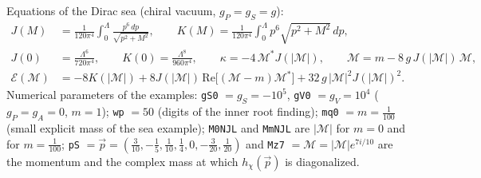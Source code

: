 \documentclass[10pt,a4paper]{article}
\begin{document}
Equations of the Dirac sea (chiral vacuum, $g_P=g_S=g$):
\begin{align*}
J(M)&=\frac{1}{120\pi^4}\int_0^\Lambda\frac{p^6\,dp}{\sqrt{p^2+M^2}},\qquad K(M)=\frac{1}{120\pi^4}\int_0^\Lambda p^6\sqrt{p^2+M^2}\,dp, \\
J(0)&=\frac{\Lambda^6}{720\pi^4},\qquad K(0)=\frac{\Lambda^8}{960\pi^4},\qquad \kappa=-4\,\mathcal M^*J(|\mathcal M|),\qquad \mathcal M=m-8\,g\,J(|\mathcal M|)\,\mathcal M, \\
\mathcal E(\mathcal M)&=-8K(|\mathcal M|)+8J(|\mathcal M|)\,\mathrm{Re}\big[(\mathcal M-m)\mathcal M^*\big]+32\,g\,|\mathcal M|^2J(|\mathcal M|)^2 .
\end{align*}
Numerical parameters of the examples: \texttt{gS0} $=g_S=-10^5$, \texttt{gV0} $=g_V=10^4$ ($g_P=g_A=0$, $m=1$); \texttt{wp} $=50$ (digits of the inner root finding); \texttt{mq0} $=m=\frac1{100}$ (small explicit mass of the sea example); \texttt{M0NJL} and \texttt{MmNJL} are $|\mathcal M|$ for $m=0$ and for $m=\frac1{100}$; \texttt{pS} $=\vec p=(\frac3{10},-\frac15,\frac1{10},\frac14,0,-\frac3{20},\frac1{20})$ and \texttt{Mz7} $=\mathcal M=|\mathcal M|e^{7i/10}$ are the momentum and the complex mass at which $h_\chi(\vec p)$ is diagonalized.
\end{document}
